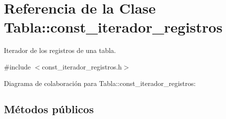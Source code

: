 \hypertarget{classTabla_1_1const__iterador__registros}{\section{Referencia de la Clase Tabla\+:\+:const\+\_\+iterador\+\_\+registros}
\label{classTabla_1_1const__iterador__registros}
}


Iterador de los registros de una tabla.  




{\ttfamily \#include $<$const\+\_\+iterador\+\_\+registros.\+h$>$}



Diagrama de colaboración para Tabla\+:\+:const\+\_\+iterador\+\_\+registros\+:
\subsection*{Métodos públicos}
